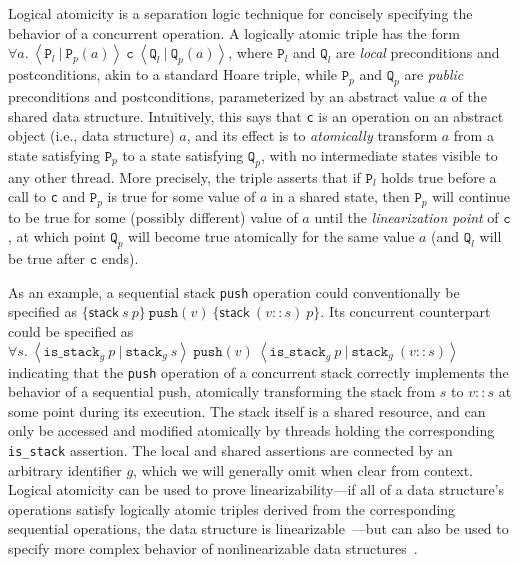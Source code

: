 \documentclass[a4paper,UKenglish,cleveref, autoref, thm-restate]{lipics-v2021}
\begin{document}
Logical atomicity is a separation logic technique for concisely specifying the behavior of a concurrent operation. A logically atomic triple has the form $\forall a.\ \left\langle \texttt{P}_l\ |\ \texttt{P}_p(a) \right\rangle\ \texttt{c}\ \left\langle \texttt{Q}_l\ |\ \texttt{Q}_p(a)\right\rangle$, where $\texttt{P}_l$ and $\texttt{Q}_l$ are \emph{local} preconditions and postconditions, akin to a standard Hoare triple, while $\texttt{P}_p$ and $\texttt{Q}_p$ are \emph{public} preconditions and postconditions, parameterized by an abstract value $a$ of the shared data structure. Intuitively, this says that \lstinline{c} is an operation on an abstract object (i.e., data structure) $a$, and its effect is to \emph{atomically} transform $a$ from a state satisfying $\texttt{P}_p$ to a state satisfying $\texttt{Q}_p$, with no intermediate states visible to any other thread. More precisely, the triple asserts that if $\texttt{P}_l$ holds true before a call to \lstinline{c} and $\texttt{P}_p$ is true for some value of $a$ in a shared state, then $\texttt{P}_p$ will continue to be true for some (possibly different) value of $a$ until the \emph{linearization point} of $\texttt{c}$, at which point $\texttt{Q}_p$ will become true atomically for the same value $a$ (and $\texttt{Q}_l$ will be true after $\texttt{c}$ ends).

As an example, a sequential stack \lstinline{push} operation could conventionally be specified as $\{\mathsf{stack}\ s\ p\}\ \texttt{push}(v)\ \{\mathsf{stack}\ (v :: s)\ p\}$. Its concurrent counterpart could be specified as 
$\forall s.\ \left\langle \texttt{is\_stack}_g\ p\ |\ \texttt{stack}_g\ s\right\rangle\ \texttt{push}(v)\ \left\langle \texttt{is\_stack}_g\ p\ |\ \texttt{stack}_g\ (v::s)\right\rangle$
indicating that the \lstinline{push} operation of a concurrent stack correctly implements the behavior of a sequential push, atomically transforming the stack from $s$ to $v::s$ at some point during its execution. The stack itself is a shared resource, and can only be accessed and modified atomically by threads holding the corresponding \texttt{is\_stack} assertion. The local and shared assertions are connected by an arbitrary identifier $g$, which we will generally omit when clear from context. Logical atomicity can be used to prove linearizability---if all of a data structure's operations satisfy logically atomic triples derived from the corresponding sequential operations, the data structure is linearizable~\cite{la-lin}---but can also be used to specify more complex behavior of nonlinearizable data structures~\cite{compass}.
\end{document}
